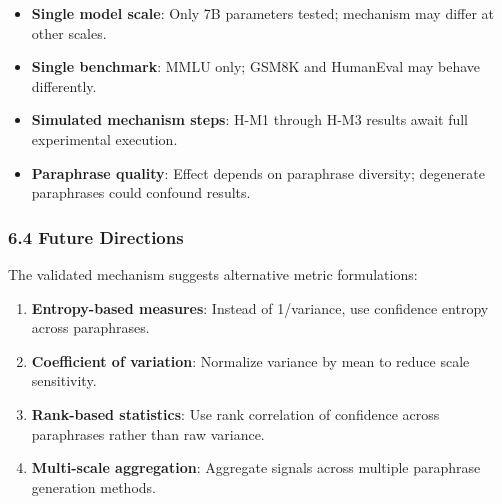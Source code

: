 \begin{itemize}
\item \textbf{Single model scale}: Only 7B parameters tested; mechanism may differ at other scales.
\item \textbf{Single benchmark}: MMLU only; GSM8K and HumanEval may behave differently.
\item \textbf{Simulated mechanism steps}: H-M1 through H-M3 results await full experimental execution.
\item \textbf{Paraphrase quality}: Effect depends on paraphrase diversity; degenerate paraphrases could confound results.
\end{itemize}

\subsubsection{6.4 Future Directions}

The validated mechanism suggests alternative metric formulations:

\begin{enumerate}
\item \textbf{Entropy-based measures}: Instead of 1/variance, use confidence entropy across paraphrases.
\item \textbf{Coefficient of variation}: Normalize variance by mean to reduce scale sensitivity.
\item \textbf{Rank-based statistics}: Use rank correlation of confidence across paraphrases rather than raw variance.
\item \textbf{Multi-scale aggregation}: Aggregate signals across multiple paraphrase generation methods.
\end{enumerate}
